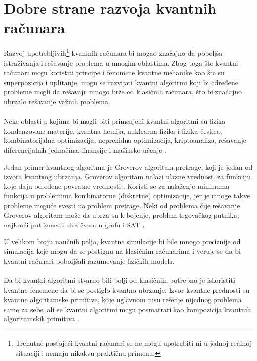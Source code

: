 \documentclass[fleqn, 12pt]{article}
\begin{document}
\newpage

\section{Dobre strane razvoja kvantnih računara}

\begin{text}
Razvoj upotrebljivih\footnote{Trenutno postojeći kvantni računari se ne mogu upotrebiti ni u jednoj realnoj situaciji i nemaju nikakvu praktičnu primenu.} kvantnih računara bi mogao značajno da poboljša istraživanja i rešavanje problema u mnogim oblastima. Zbog toga što kvantni računari mogu koristiti principe i fenomene kvantne mehanike kao što su superpozicija i uplitanje, mogu se razvijati kvantni algoritmi koji bi određene probleme mogli da rešavaju mnogo brže od klasičnih računara, što bi značajno ubrzalo rešavanje važnih problema.
\\\\

Neke oblasti u kojima bi mogli biti primenjeni kvantni algoritmi su fizika kondenzovane materije, kvantna hemija, nuklearna fizika i fizika čestica, kombinatorijalna optimizacija, neprekidna optimizacija, kriptoanaliza, rešavanje diferencijalnih jednačina, finansije i mašinsko učenje \cite{G2}.

Jedan primer kvantnog algoritma je Groverov algoritam pretrage, koji je jedan od izvora kvantnog ubrzanja. Groverov algoritam nalazi ulazne vrednosti za funkciju koje daju određene povratne vrednosti \cite{G1}. Koristi se za nalaženje minimuma funkcija u problemima kombinatorne (diskretne) optimizacije, jer je mnoge takve probleme moguće svesti na problem pretrage. Neki od problema čije rešavanje Groverov algoritam može da ubrza su k-bojenje, problem trgovačkog putnika, najkraći put između dva čvora u grafu i SAT \cite{G2}.

U velikom broju naučnih polja, kvantne simulacije bi bile mnogo preciznije od simulacija koje mogu da se postignu na klasičnim računarima i veruje se da bi kvantni računari poboljšali razumevanje fizičkih modela. 
\\\\

Da bi kvantni algoritmi stvarno bili bolji od klasičnih, potrebno je iskoristiti kvantne fenomene da bi se postiglo kvantno ubrzanje. Izvor kvantne prednosti su kvantne algoritamske primitive, koje uglavnom nisu rešenje nijednog problema same za sebe, ali se kvantni algoritmi mogu posmatrati kao kompozicija kvantnih algoritamskih primitiva \cite{G2}.


\end{text}
\end{document}
